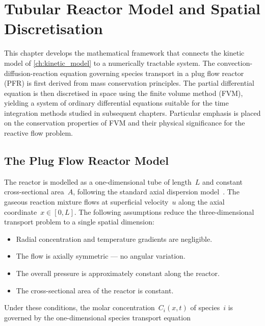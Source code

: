 
\chapter{Tubular Reactor Model and Spatial Discretisation}\label{ch:governing_eqs}

This chapter develops the mathematical framework that connects the kinetic model of \cref{ch:kinetic_model} to a numerically tractable system. The convection-diffusion-reaction equation governing species transport in a plug flow reactor (PFR) is first derived from mass conservation principles. The partial differential equation is then discretised in space using the finite volume method (FVM), yielding a system of ordinary differential equations suitable for the time integration methods studied in subsequent chapters. Particular emphasis is placed on the conservation properties of FVM and their physical significance for the reactive flow problem.

\section{The Plug Flow Reactor Model}\label{sec:pfr_model}

The reactor is modelled as a one-dimensional tube of length~\(L\) and constant cross-sectional area~\(A\), following the standard axial dispersion model~\cite{Levenspiel1999, Froment2011}. The gaseous reaction mixture flows at superficial velocity~\(u\) along the axial coordinate~\(x \in [0, L]\). The following assumptions reduce the three-dimensional transport problem to a single spatial dimension:

%
\begin{itemize}
  \item Radial concentration and temperature gradients are negligible.
  \item The flow is axially symmetric --- no angular variation.
  \item The overall pressure is approximately constant along the reactor.
  \item The cross-sectional area of the reactor is constant.
\end{itemize}

Under these conditions, the molar concentration~\(C_i(x,t)\) of species~\(i\) is governed by the one-dimensional species transport equation

